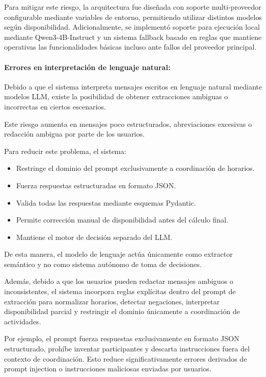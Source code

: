 Para mitigar este riesgo, la arquitectura fue diseñada con soporte multi-proveedor configurable mediante variables de entorno, permitiendo utilizar distintos modelos según disponibilidad. Adicionalmente, se implementó soporte para ejecución local mediante Qwen3-4B-Instruct y un sistema fallback basado en reglas que mantiene operativas las funcionalidades básicas incluso ante fallos del proveedor principal.

\paragraph{Errores en interpretación de lenguaje natural:}

Debido a que el sistema interpreta mensajes escritos en lenguaje natural mediante modelos LLM, existe la posibilidad de obtener extracciones ambiguas o incorrectas en ciertos escenarios.

Este riesgo aumenta en mensajes poco estructurados, abreviaciones excesivas o redacción ambigua por parte de los usuarios.

Para reducir este problema, el sistema:

\begin{itemize}
    \item Restringe el dominio del prompt exclusivamente a coordinación de horarios.
    \item Fuerza respuestas estructuradas en formato JSON.
    \item Valida todas las respuestas mediante esquemas Pydantic.
    \item Permite corrección manual de disponibilidad antes del cálculo final.
    \item Mantiene el motor de decisión separado del LLM.
\end{itemize}

De esta manera, el modelo de lenguaje actúa únicamente como extractor semántico y no como sistema autónomo de toma de decisiones.

Además, debido a que los usuarios pueden redactar mensajes ambiguos o inconsistentes, el sistema incorpora reglas explícitas dentro del prompt de extracción para normalizar horarios, detectar negaciones, interpretar disponibilidad parcial y restringir el dominio únicamente a coordinación de actividades.

Por ejemplo, el prompt fuerza respuestas exclusivamente en formato JSON estructurado, prohíbe inventar participantes y descarta instrucciones fuera del contexto de coordinación. Esto reduce significativamente errores derivados de prompt injection o instrucciones maliciosas enviadas por usuarios.

